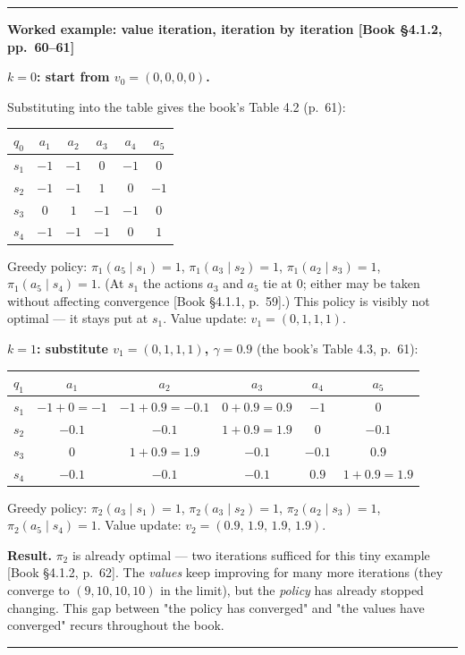 \documentclass[11pt, letterpaper]{article}
\theoremstyle{runin}
\theoremstyle{runinplain}
\theoremstyle{remark}
\newcommand{\bkin}[1]{{\color{bookblue}\small[\textsf{Book #1}]}}
\newenvironment{worked}[1]
  {\par\medskip\noindent\rule{\textwidth}{0.4pt}\par\nobreak\vspace{0.3em}
   \noindent\textbf{Worked example: #1}\par\nobreak\vspace{0.2em}\small}
  {\par\nobreak\vspace{0.3em}\noindent\rule{\textwidth}{0.4pt}\par\medskip}
\begin{document}
\begin{worked}{value iteration, iteration by iteration \bkin{\S4.1.2, pp.~60--61}}
\textbf{$k=0$: start from $v_0=(0,0,0,0)$.}

Substituting into the table gives the book's Table 4.2 (p.~61):
\begin{center}
\small
\begin{tabular}{@{}lccccc@{}}
\toprule
$q_0$ & $a_1$ & $a_2$ & $a_3$ & $a_4$ & $a_5$\\
\midrule
$s_1$ & $-1$ & $-1$ & $0$ & $-1$ & $0$\\
$s_2$ & $-1$ & $-1$ & $1$ & $0$ & $-1$\\
$s_3$ & $0$ & $1$ & $-1$ & $-1$ & $0$\\
$s_4$ & $-1$ & $-1$ & $-1$ & $0$ & $1$\\
\bottomrule
\end{tabular}
\end{center}
Greedy policy: $\pi_1(a_5\mid s_1)=1$, $\pi_1(a_3\mid s_2)=1$,
$\pi_1(a_2\mid s_3)=1$, $\pi_1(a_5\mid s_4)=1$. (At $s_1$ the actions $a_3$ and
$a_5$ tie at $0$; either may be taken without affecting convergence
\bkin{\S4.1.1, p.~59}.) This policy is visibly not optimal --- it stays put at
$s_1$. Value update: $v_1=(0,1,1,1)$.

\textbf{$k=1$: substitute $v_1=(0,1,1,1)$, $\gamma=0.9$} (the book's Table 4.3, p.~61):
\begin{center}
\small
\begin{tabular}{@{}lccccc@{}}
\toprule
$q_1$ & $a_1$ & $a_2$ & $a_3$ & $a_4$ & $a_5$\\
\midrule
$s_1$ & $-1+0=-1$ & $-1+0.9=-0.1$ & $0+0.9=\mathbf{0.9}$ & $-1$ & $0$\\
$s_2$ & $-0.1$ & $-0.1$ & $1+0.9=\mathbf{1.9}$ & $0$ & $-0.1$\\
$s_3$ & $0$ & $1+0.9=\mathbf{1.9}$ & $-0.1$ & $-0.1$ & $0.9$\\
$s_4$ & $-0.1$ & $-0.1$ & $-0.1$ & $0.9$ & $1+0.9=\mathbf{1.9}$\\
\bottomrule
\end{tabular}
\end{center}
Greedy policy: $\pi_2(a_3\mid s_1)=1$, $\pi_2(a_3\mid s_2)=1$,
$\pi_2(a_2\mid s_3)=1$, $\pi_2(a_5\mid s_4)=1$. Value update:
$v_2=(0.9,\,1.9,\,1.9,\,1.9)$.

\textbf{Result.} $\pi_2$ is already optimal --- two iterations sufficed for this
tiny example \bkin{\S4.1.2, p.~62}. The \emph{values} keep improving for many more
iterations (they converge to $(9,10,10,10)$ in the limit), but the \emph{policy}
has already stopped changing. This gap between "the policy has converged" and "the
values have converged" recurs throughout the book.
\end{worked}
\end{document}

